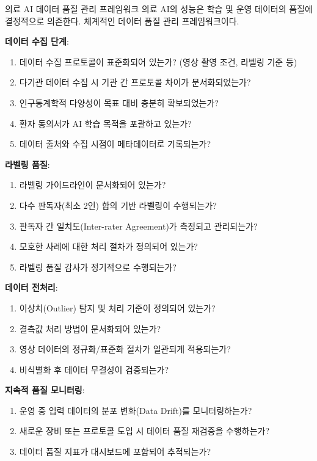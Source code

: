 \begin{practicaltool}{의료 AI 데이터 품질 관리 프레임워크}
의료 AI의 성능은 학습 및 운영 데이터의 품질에 결정적으로 의존한다. 체계적인 데이터 품질 관리 프레임워크이다.

\textbf{데이터 수집 단계}:
\begin{enumerate}
 \item 데이터 수집 프로토콜이 표준화되어 있는가? (영상 촬영 조건, 라벨링 기준 등)
 \item 다기관 데이터 수집 시 기관 간 프로토콜 차이가 문서화되었는가?
 \item 인구통계학적 다양성이 목표 대비 충분히 확보되었는가?
 \item 환자 동의서가 AI 학습 목적을 포괄하고 있는가?
 \item 데이터 출처와 수집 시점이 메타데이터로 기록되는가?
\end{enumerate}

\textbf{라벨링 품질}:
\begin{enumerate}
 \item 라벨링 가이드라인이 문서화되어 있는가?
 \item 다수 판독자(최소 2인) 합의 기반 라벨링이 수행되는가?
 \item 판독자 간 일치도(Inter-rater Agreement)가 측정되고 관리되는가?
 \item 모호한 사례에 대한 처리 절차가 정의되어 있는가?
 \item 라벨링 품질 감사가 정기적으로 수행되는가?
\end{enumerate}

\textbf{데이터 전처리}:
\begin{enumerate}
 \item 이상치(Outlier) 탐지 및 처리 기준이 정의되어 있는가?
 \item 결측값 처리 방법이 문서화되어 있는가?
 \item 영상 데이터의 정규화/표준화 절차가 일관되게 적용되는가?
 \item 비식별화 후 데이터 무결성이 검증되는가?
\end{enumerate}

\textbf{지속적 품질 모니터링}:
\begin{enumerate}
 \item 운영 중 입력 데이터의 분포 변화(Data Drift)를 모니터링하는가?
 \item 새로운 장비 또는 프로토콜 도입 시 데이터 품질 재검증을 수행하는가?
 \item 데이터 품질 지표가 대시보드에 포함되어 추적되는가?
\end{enumerate}
\end{practicaltool}

